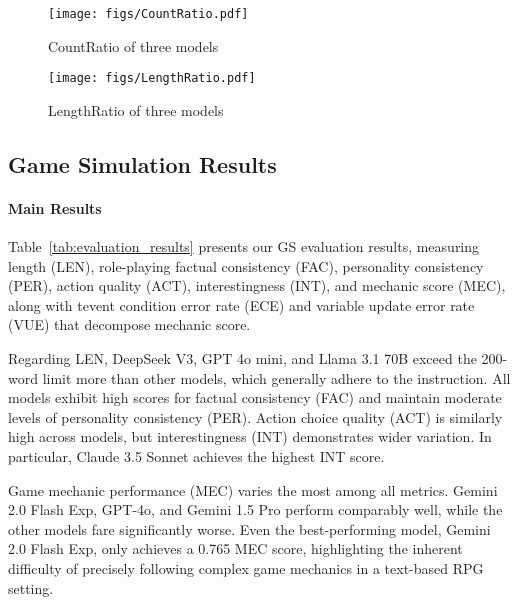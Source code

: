 \begin{figure}[!t]
    \centering
    \texttt{[image: figs/CountRatio.pdf]}
    \caption{CountRatio of three models}
    \label{fig:gc_eval_cr}
\end{figure}
\begin{figure}[!t]
    \centering
    \texttt{[image: figs/LengthRatio.pdf]}
    \caption{LengthRatio of three models}
    \label{fig:gc_eval_lr}
\end{figure}

\subsection{Game Simulation Results}
\paragraph{Main Results} Table~\ref{tab:evaluation_results} presents our GS evaluation results, measuring length (LEN), role-playing factual consistency (FAC), personality consistency (PER), action quality (ACT), interestingness (INT), and mechanic score (MEC), along with tevent condition error rate (ECE) and variable update error rate (VUE) that decompose mechanic score.

Regarding LEN, DeepSeek V3, GPT 4o mini, and Llama 3.1 70B exceed the 200-word limit more than other models, which generally adhere to the instruction. All models exhibit high scores for factual consistency (FAC) and maintain moderate levels of personality consistency (PER). Action choice quality (ACT) is similarly high across models, but interestingness (INT) demonstrates wider variation. In particular, Claude 3.5 Sonnet achieves the highest INT score.

Game mechanic performance (MEC) varies the most among all metrics. Gemini 2.0 Flash Exp, GPT-4o, and Gemini 1.5 Pro perform comparably well, while the other models fare significantly worse. Even the best-performing model, Gemini 2.0 Flash Exp, only achieves a 0.765 MEC score, highlighting the inherent difficulty of precisely following complex game mechanics in a text-based RPG setting.

